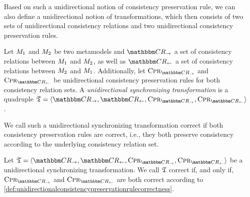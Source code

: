 Based on such a unidirectional notion of consistency preservation rule, we can also define a unidirectional notion of transformations, which then consists of two sets of unidirectional consistency relations and two unidirectional consistency preservation rules.

\begin{definition}
    \label{def:unidirectionalsynchronizingtransformation}
    Let $M_{1}$ and $M_{2}$ be two metamodels and $\consistencyrelationset{CR}_{\rightarrow}$ a set of consistency relations between $M_{1}$ and $M_{2}$, as well as $\consistencyrelationset{CR}_{\leftarrow}$ a set of consistency relations between $M_{2}$ and $M_{1}$.
    Additionally, let $\consistencypreservationrule{\consistencyrelationset{CR}_{\rightarrow}}$ and $\consistencypreservationrule{\consistencyrelationset{CR}_{\leftarrow}}$ be unidirectional consistency preservation rules for both consistency relation sets.
    A \emph{unidirectional synchronizing transformation} is a quadruple $\transformation{T} = \tupled{\consistencyrelationset{CR}_{\rightarrow}, \consistencyrelationset{CR}_{\leftarrow},\consistencypreservationrule{\consistencyrelationset{CR}_{\rightarrow}}, \consistencypreservationrule{\consistencyrelationset{CR}_{\leftarrow}}}$.
\end{definition}

We call such a unidirectional synchronizing transformation correct if both consistency preservation rules are correct, i.e., they both preserve consistency according to the underlying consistency relation set.

\begin{definition}
    \label{def:unidirectionalsynchronizingtransformationcorrectness}
    Let $\transformation{T} = \tupled{\consistencyrelationset{CR}_{\rightarrow}, \consistencyrelationset{CR}_{\leftarrow},\consistencypreservationrule{\consistencyrelationset{CR}_{\rightarrow}}, \consistencypreservationrule{\consistencyrelationset{CR}_{\leftarrow}}}$ be a unidirectional synchronizing transformation.
    We call $\mathfrak{T}$ correct if, and only if, $\consistencypreservationrule{\consistencyrelationset{CR}_{\rightarrow}}$ and $\consistencypreservationrule{\consistencyrelationset{CR}_{\leftarrow}}$ are both correct according to \autoref{def:unidirectionalconsistencypreservationrulecorrectness}.
\end{definition}

